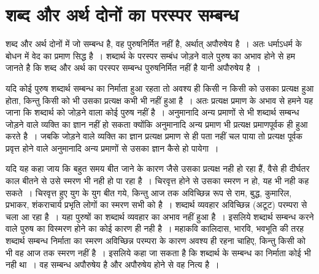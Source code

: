 \section*{शब्द और अर्थ दोनों का परस्पर सम्बन्ध}

\vskip -6pt

शब्द और अर्थ दोनों में जो सम्बन्ध है, वह पुरुषनिर्मित नहीं है, अर्थात् अपौरुषेय है~। अतः धर्माऽधर्म के बोधन में वेद का प्रमाण सिद्ध है~। शब्दार्थ के परस्पर सम्बंध जोड़ने वाले पुरुष का अभाव होने से हम जानते है कि शब्द और अर्थ का परस्पर सम्बन्ध पुरुषनिर्मित नहीं है यानी अपौरुषेय है~।

यदि कोई पुरुष शब्दार्थ सम्बन्ध का निर्माता हुआ रहता तो अवश्य ही किसी न किसी को उसका प्रत्यक्ष हुआ होता, किन्तु किसी को भी उसका प्रत्यक्ष कभी भी नहीं हुआ है~। अतः प्रत्यक्ष प्रमाण के अभाव से हमने यह जाना कि शब्दार्थ को जोड़ने वाला कोई पुरुष नहीं है~। अनुमानादि अन्य प्रमाणों से भी शब्दार्थ सम्बन्ध जोड़ने वाले व्यक्ति का ज्ञान नहीं हो सकता क्योंकि अनुमानादि अन्य प्रमाण भी प्रत्यक्ष प्रमाणपूर्वक ही हुआ करते है~। जबकि जोड़ने वाले व्यक्ति का ज्ञान प्रत्यक्ष प्रमाण से ही पता नहीं चल पाया तो प्रत्यक्ष पूर्वक प्रवृत्त होने वाले अनुमानादि अन्य प्रमाणों से उसका ज्ञान कैसे हो पायेगा~।

यदि यह कहा जाय कि बहुत समय बीत जाने के कारण जैसे उसका प्रत्यक्ष नही हो रहा हैं, वैसे ही दीर्घतर काल बीतने से उसे स्मरण भी नही हो पा रहा है~। चिरवृत्त होने से उसका स्मरण न हो, यह भी नही कह सकते~। चिरवृत्त हुए युग के युग बीत गये, किन्तु आज तक अविच्छिन्न रूप से राम, बुद्ध, कुमारिल, प्रभाकर, शंकराचार्य प्रभृति लोगों का स्मरण सभी को है~। शब्दार्थ व्यवहार अविच्छिन्न (अटूट) परम्परा से चला आ रहा है~। यहा पुरुषों का शब्दार्थ व्यवहार का अभाव नहीं हुआ है~। इसलिये शब्दार्थ सम्बन्ध करने वाले पुरुष का विस्मरण होने का कोई कारण ही नही है~। महाकवि कालिदास, भारवि, भवभूति की तरह शब्दार्थ सम्बन्ध निर्माता का स्मरण अविच्छिन्न परम्परा के कारण अवश्य ही रहना चाहिए, किन्तु किसी को भी वह आज तक स्मरण नहीं है~। इसलिये कहा जा सकता है कि शब्दार्थ के सम्बन्ध का निर्माता कोई भी नही था~। वह सम्बन्ध अपौरुषेय है और अपौरुषेय होने से वह नित्य है~। 


